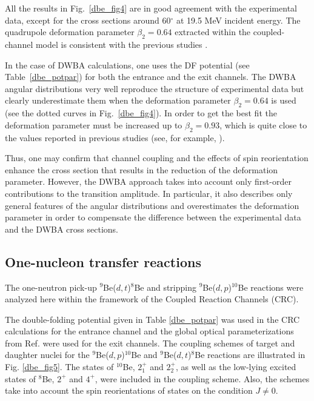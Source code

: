 \documentclass[
12pt, %
oneside, %
english, %
onehalfspacing, %
onehalfspacing, %
headsepline, %
]{MastersDoctoralThesis} %
\begin{document}
All the results in Fig.~\ref{dbe_fig4} are in good agreement with the experimental data, except for the cross sections around 60$^\circ$ at 19.5 MeV incident energy. The quadrupole deformation parameter $\beta_2 = 0.64$ extracted within the coupled-channel model is consistent with the previous studies \cite{lukyanov2014study, harakeh1980strong}.

In the case of DWBA calculations, one uses the DF potential (see Table~\ref{dbe_potpar}) for both the entrance and the exit channels. The DWBA angular distributions very well reproduce the structure of experimental data but clearly underestimate them when the deformation parameter $\beta_2 = 0.64$ is used (see the dotted curves in Fig.~\ref{dbe_fig4}). In order to get the best fit the deformation parameter must be increased up to $\beta_2 = 0.93$, which is quite close to the values reported in previous studies (see, for example, \cite{bodek1989, votava1973}).

Thus, one may confirm that channel coupling and the effects of spin reorientation enhance the cross section that results in the reduction of the deformation parameter. However, the DWBA approach takes into account only first-order contributions to the transition amplitude. In particular, it also describes only general features of the angular distributions and overestimates the deformation parameter in order to compensate the difference between the experimental data and the DWBA cross sections.

\subsection{One-nucleon transfer reactions }

The one-neutron pick-up ${}^9$Be($d,t$)${}^8$Be and stripping ${}^9$Be($d,p$)${}^{10}$Be reactions were analyzed here within the framework of  the Coupled Reaction Channels (CRC).

The double-folding potential given in Table \ref{dbe_potpar} was used in the CRC calculations for the entrance channel and the global optical parameterizations from Ref. \cite{globalProton, globalTriton} were used for the exit channels. The coupling schemes of target and daughter nuclei for the ${}^9$Be($d,p$)${}^{10}$Be and ${}^9$Be($d,t$)${}^8$Be  reactions  are illustrated in Fig. \ref{dbe_fig5}. The states of ${}^{10}$Be, $2^+_{1}$ and $2^+_{2}$, as well as the low-lying excited states of ${}^8$Be, $2^+$ and $4^+$, were included in the coupling scheme. Also, the schemes take into account the spin reorientations of states on the condition $J \neq 0$.
\end{document}
